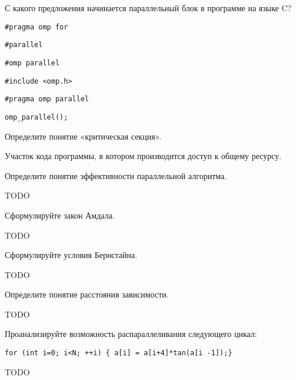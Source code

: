 \documentclass[a4paper, 12pt, addpoints]{exam}
\newcommand{\todo}{{\color{red}TODO}\ }
\begin{document}
\begin{questions}
\question[1] С какого предложения начинается параллельный блок в программе на языке C?
\begin{choices}
    \choice \begin{verbatim}#pragma omp for\end{verbatim}
    \choice \begin{verbatim}#parallel\end{verbatim}
    \choice \begin{verbatim}#omp parallel\end{verbatim}
    \choice \begin{verbatim}#include <omp.h>\end{verbatim}
    \correctchoice \begin{verbatim}#pragma omp parallel\end{verbatim}
    \choice \begin{verbatim}omp_parallel();\end{verbatim}
\end{choices}



\question[3] Определите понятие «критическая секция».
\begin{solution}[2cm]
Участок кода программы, в котором производится доступ к общему ресурсу.
\end{solution}

\question[3] Определите понятие эффективности параллельной алгоритма.
\begin{solution}[2cm]
\todo
\end{solution}

\question[3] Сформулируйте закон Амдала.
\begin{solution}[2cm]
\todo
\end{solution}

\question[3] Сформулируйте условия Бернстайна.
\begin{solution}[2cm]
\todo
\end{solution}

\question[3] Определите понятие расстояния зависимости.
\begin{solution}[2cm]
\todo
\end{solution}

\question[3] Проанализируйте возможность распараллеливания следующего цикал:
\begin{lstlisting}
for (int i=0; i<N; ++i) { a[i] = a[i+4]*tan(a[i -1]);}
\end{lstlisting}
\begin{solution}[2cm]
\todo
\end{solution}


\end{questions}
\end{document}
